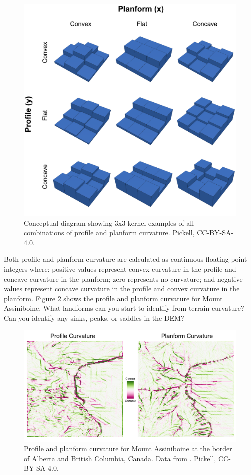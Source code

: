 \documentclass[
]{book}
\begin{document}
\begin{figure}
\includegraphics[width=0.75\linewidth]{images/09-stacked-profile-planform-kernel} \caption{Conceptual diagram showing 3x3 kernel examples of all combinations of profile and planform curvature. Pickell, CC-BY-SA-4.0.}\label{fig:9-stacked-profile-planform-kernel}
\end{figure}

Both profile and planform curvature are calculated as continuous floating point integers where: positive values represent convex curvature in the profile and concave curvature in the planform; zero represents no curvature; and negative values represent concave curvature in the profile and convex curvature in the planform. Figure \ref{fig:9-mount-assiniboine-profile-planform-curvature} shows the profile and planform curvature for Mount Assiniboine. What landforms can you start to identify from terrain curvature? Can you identify any sinks, peaks, or saddles in the DEM?



\begin{figure}
\includegraphics[width=0.75\linewidth]{images/09-mount-assiniboine-profile-planform-curvature} \caption{Profile and planform curvature for Mount Assiniboine at the border of Alberta and British Columbia, Canada. Data from \citep{natural_resources_canada_canadian_2015}. Pickell, CC-BY-SA-4.0.}\label{fig:9-mount-assiniboine-profile-planform-curvature}
\end{figure}
\end{document}
